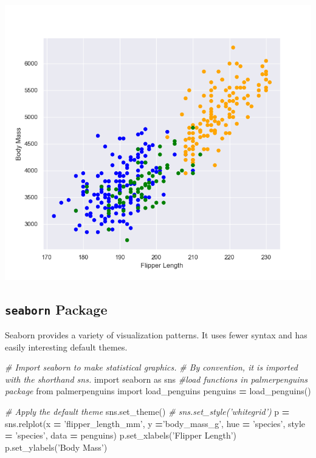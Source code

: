 \documentclass[]{book}
\newenvironment{Shaded}{\begin{snugshade}}{\end{snugshade}}
\newcommand{\CommentTok}[1]{\textcolor[rgb]{0.56,0.35,0.01}{\textit{#1}}}
\newcommand{\ImportTok}[1]{#1}
\newcommand{\NormalTok}[1]{#1}
\newcommand{\OperatorTok}[1]{\textcolor[rgb]{0.81,0.36,0.00}{\textbf{#1}}}
\newcommand{\StringTok}[1]{\textcolor[rgb]{0.31,0.60,0.02}{#1}}
\begin{document}
\begin{center}\includegraphics[width=0.9\linewidth]{fig/Viz_chap/1_matplot} \end{center}

\hypertarget{seaborn-package}{%
\subsection{\texorpdfstring{\texttt{seaborn} Package}{seaborn Package}}\label{seaborn-package}}

Seaborn provides a variety of visualization patterns. It uses fewer syntax and has easily interesting default themes.

\begin{Shaded}
\begin{Highlighting}[]
\CommentTok{# Import seaborn to make statistical graphics. }
\CommentTok{# By convention, it is imported with the shorthand sns.}
\ImportTok{import}\NormalTok{ seaborn }\ImportTok{as}\NormalTok{ sns }
\CommentTok{#load functions in palmerpenguins package}
\ImportTok{from}\NormalTok{ palmerpenguins }\ImportTok{import}\NormalTok{ load_penguins}
\NormalTok{penguins }\OperatorTok{=}\NormalTok{ load_penguins()}

\CommentTok{# Apply the default theme}
\NormalTok{sns.set_theme()}
\CommentTok{# sns.set_style('whitegrid')}
\NormalTok{p }\OperatorTok{=}\NormalTok{ sns.relplot(x }\OperatorTok{=} \StringTok{'flipper_length_mm'}\NormalTok{,}
\NormalTok{            y }\OperatorTok{=}\StringTok{'body_mass_g'}\NormalTok{,}
\NormalTok{            hue }\OperatorTok{=} \StringTok{'species'}\NormalTok{,}
\NormalTok{            style }\OperatorTok{=} \StringTok{'species'}\NormalTok{,}
\NormalTok{            data }\OperatorTok{=}\NormalTok{ penguins)}
\NormalTok{p.set_xlabels(}\StringTok{'Flipper Length'}\NormalTok{)}
\NormalTok{p.set_ylabels(}\StringTok{'Body Mass'}\NormalTok{)   }
\end{Highlighting}
\end{Shaded}
\end{document}
